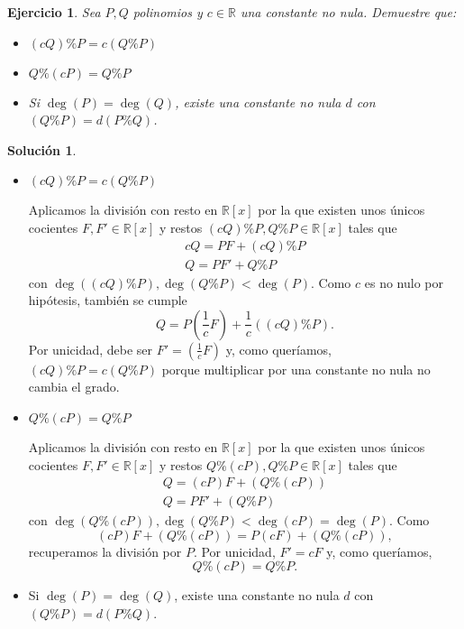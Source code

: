 \documentclass[10pt]{article}
\newtheorem{ejer}{Ejercicio}
\theoremstyle{definition}
\newtheorem*{sol}{Solución}
\newcommand{\RR}{\mathbb{R}}
\newcommand{\RRx}{\mathbb{R}[x]}
\begin{document}
\begin{ejer} Sea $P,Q$ polinomios y $c\in\RR$ una constante no nula. Demuestre que:
\begin{itemize}
    \item $(cQ)\% P=c(Q\% P)$
    \item $Q\%(cP) = Q\% P$
    \item Si $\deg(P) = \deg(Q)$, existe una constante no nula $d$ con $(Q\%P)=d(P\% Q)$.
\end{itemize}
\end{ejer}
\begin{sol}\leavevmode
\begin{itemize}
    \item $(cQ)\% P=c(Q\% P)$
    
    Aplicamos la división con resto en $\RRx$ por la que existen unos únicos cocientes $F,F'\in\RRx$ y restos $(cQ)\% P, Q\% P\in\RRx$ tales que 
    \[\begin{array}{l}
        cQ = PF+(cQ)\%P \\
        Q = PF'+Q\% P
    \end{array}
    \]
    con $\deg((cQ)\%P),\deg(Q\%P)<\deg(P)$. Como $c$ es no nulo por hipótesis, también se cumple \[Q=P\left(\frac{1}{c}F\right)+\frac{1}{c}\left((cQ)\% P\right).\]
    Por unicidad, debe ser $F'=\left(\frac{1}{c}F\right)$ y, como queríamos, $(cQ)\% P=c(Q\% P)$ porque multiplicar por una constante no nula no cambia el grado.
    
    \item $Q\%(cP) = Q\% P$
    
    Aplicamos la división con resto en $\RRx$ por la que existen unos únicos cocientes $F,F'\in\RRx$ y restos $Q\%(cP),Q\% P\in\RRx$ tales que
    \[\begin{array}{l}
        Q = (cP)F+(Q\%(cP))\\
        Q = PF'+(Q\%P)
    \end{array}\]
    con $\deg(Q\%(cP)),\deg(Q\% P)<\deg(cP)=\deg(P)$. Como \[(cP)F+(Q\%(cP))=P(cF)+(Q\%(cP)),\] recuperamos la división por $P$. Por unicidad, $F'=cF$ y, como queríamos, \[Q\% (cP) = Q\% P.\]
    \item Si $\deg(P) = \deg(Q)$, existe una constante no nula $d$ con $(Q\%P)=d(P\% Q)$.
    

\end{itemize}
\end{sol}
\end{document}
